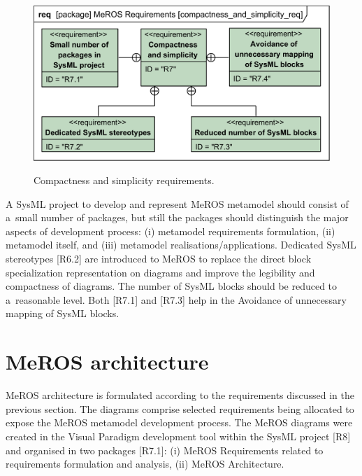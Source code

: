 \documentclass[11pt,oneside,a4paper]{report}
\begin{document}
	\begin{figure}[H]
		\centering
		\begin{center}
			{\includegraphics[scale=1.0]{diagrams/compactness_and_simplicity_req.png}}
		\end{center}
		\caption{Compactness and simplicity requirements.} 
		\label{fig:compactness_and_simplicity_req}
	\end{figure}
	
	A SysML project to develop and represent MeROS metamodel should consist of a~small number of packages, but still the packages should distinguish the major aspects of development process: (i) metamodel requirements formulation, (ii) metamodel itself, and (iii) metamodel realisations/applications.
	Dedicated SysML stereotypes [R6.2] are introduced to MeROS to replace the direct block specialization representation on diagrams and improve the legibility and compactness of diagrams.
	The number of SysML blocks should be reduced to a~reasonable level. Both [R7.1] and [R7.3] help in the Avoidance of unnecessary mapping of SysML blocks.

	
	
\chapter{MeROS architecture}
\label{ch:architecture}

	MeROS architecture is formulated according to the requirements discussed in the previous section. The diagrams comprise selected requirements being allocated to expose the MeROS metamodel development process. 
	The MeROS diagrams were created in the Visual Paradigm development tool within the SysML project [R8] and organised in two packages [R7.1]: (i) MeROS Requirements related to requirements formulation and analysis, (ii) MeROS Architecture.
		
\end{document}
